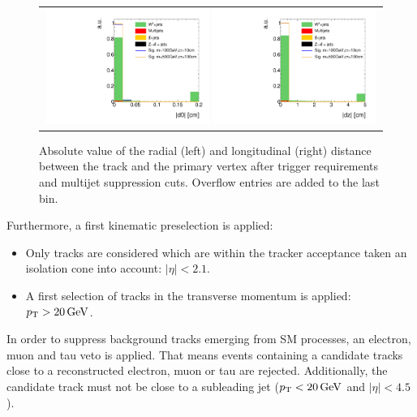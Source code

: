 \begin{figure}[!t]
  \centering 
  \begin{tabular}{c}
    \includegraphics[width=0.49\textwidth]{figures/analysis/AnalysisSelection/chiTracksQCDsupressionTrigger_2Signals_FullBkg/htrackd0_lin.pdf}
    \includegraphics[width=0.49\textwidth]{figures/analysis/AnalysisSelection/chiTracksQCDsupressionTrigger_2Signals_FullBkg/htrackdz_lin.pdf}
  \end{tabular}
  \caption{Absolute value of the radial (left) and longitudinal (right) distance between the track and the primary vertex after trigger requirements and multijet suppression cuts. 
           Overflow entries are added to the last bin.}
  \label{fig:d0_dz}
\end{figure}

Furthermore, a first kinematic preselection is applied:
\begin{itemize}
\renewcommand{\labelitemi}{\footnotesize{\ding{118}}}
\item Only tracks are considered which are within the tracker acceptance taken an isolation cone into account: $|\eta|<2.1$.
\item A first selection of tracks in the transverse momentum is applied: \mbox{$p_{\text{T}}>20\,\text{Ge}\kern-0.06667em\text{V}$}.
\end{itemize}
In order to suppress background tracks emerging from SM processes, an electron, muon and tau veto is applied.
That means events containing a candidate tracks close to a reconstructed electron, muon or tau are rejected.
Additionally, the candidate track must not be close to a subleading jet ($p_{\text{T}}<20\,\text{Ge}\kern-0.06667em\text{V}$ and $|\eta|<4.5$).


